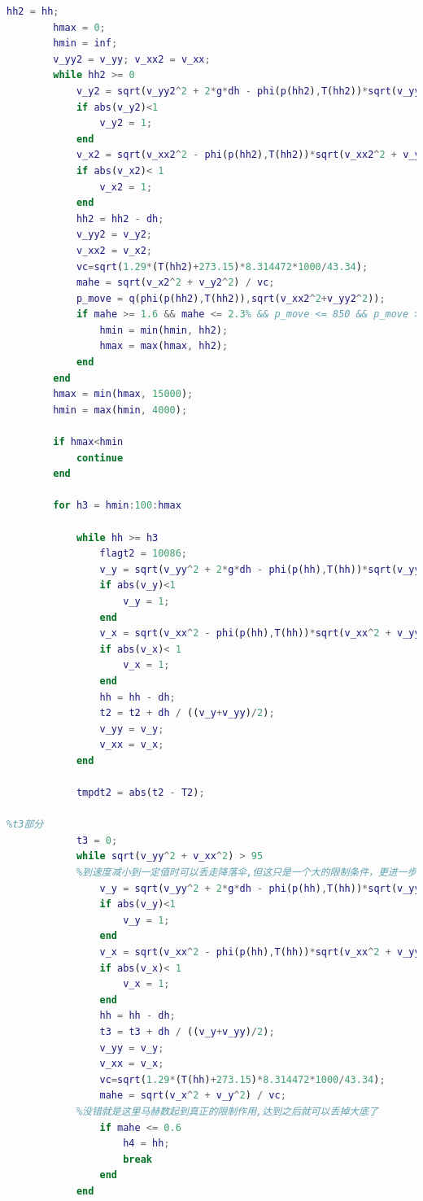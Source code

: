 \documentclass[hyperref,a4paper,UTF8]{ctexart}
\begin{document}
\begin{lstlisting}[language=Matlab]
        hh2 = hh;
        hmax = 0;
        hmin = inf;
        v_yy2 = v_yy; v_xx2 = v_xx;
        while hh2 >= 0
            v_y2 = sqrt(v_yy2^2 + 2*g*dh - phi(p(hh2),T(hh2))*sqrt(v_yy2^2+v_xx2^2)*S_floor*dh*v_yy2/m);
            if abs(v_y2)<1  
                v_y2 = 1;
            end
            v_x2 = sqrt(v_xx2^2 - phi(p(hh2),T(hh2))*sqrt(v_xx2^2 + v_yy2^2)*S_floor*dh*v_xx2^2 / (m * v_yy2));
            if abs(v_x2)< 1
                v_x2 = 1;
            end
            hh2 = hh2 - dh;
            v_yy2 = v_y2;
            v_xx2 = v_x2;
            vc=sqrt(1.29*(T(hh2)+273.15)*8.314472*1000/43.34);
            mahe = sqrt(v_x2^2 + v_y2^2) / vc;
            p_move = q(phi(p(hh2),T(hh2)),sqrt(v_xx2^2+v_yy2^2));
            if mahe >= 1.6 && mahe <= 2.3% && p_move <= 850 && p_move >= 250
                hmin = min(hmin, hh2);
                hmax = max(hmax, hh2);
            end
        end
        hmax = min(hmax, 15000);
        hmin = max(hmin, 4000);
        
        if hmax<hmin
            continue
        end
        
        for h3 = hmin:100:hmax

            while hh >= h3
                flagt2 = 10086;
                v_y = sqrt(v_yy^2 + 2*g*dh - phi(p(hh),T(hh))*sqrt(v_yy^2+v_xx^2)*S_floor*dh*v_yy/m);
                if abs(v_y)<1  
                    v_y = 1;
                end
                v_x = sqrt(v_xx^2 - phi(p(hh),T(hh))*sqrt(v_xx^2 + v_yy^2)*S_floor*dh*v_xx^2 / (m * v_yy));
                if abs(v_x)< 1
                    v_x = 1;
                end
                hh = hh - dh;
                t2 = t2 + dh / ((v_y+v_yy)/2);
                v_yy = v_y;
                v_xx = v_x;
            end
            
            tmpdt2 = abs(t2 - T2);

%t3部分
            t3 = 0;
            while sqrt(v_yy^2 + v_xx^2) > 95 
            %到速度减小到一定值时可以丢走降落伞,但这只是一个大的限制条件，更进一步的条件是马赫数
                v_y = sqrt(v_yy^2 + 2*g*dh - phi(p(hh),T(hh))*sqrt(v_yy^2+v_xx^2)*(S_floor+S_para)*dh*v_yy/m);
                if abs(v_y)<1  
                    v_y = 1;
                end
                v_x = sqrt(v_xx^2 - phi(p(hh),T(hh))*sqrt(v_xx^2 + v_yy^2)*(S_floor+S_para)*dh*v_xx^2 / (m * v_yy));
                if abs(v_x)< 1
                    v_x = 1;
                end
                hh = hh - dh;
                t3 = t3 + dh / ((v_y+v_yy)/2);
                v_yy = v_y;
                v_xx = v_x;         
                vc=sqrt(1.29*(T(hh)+273.15)*8.314472*1000/43.34);
                mahe = sqrt(v_x^2 + v_y^2) / vc;
            %没错就是这里马赫数起到真正的限制作用,达到之后就可以丢掉大底了
                if mahe <= 0.6
                    h4 = hh;
                    break
                end
            end


\end{lstlisting}
\end{document}
